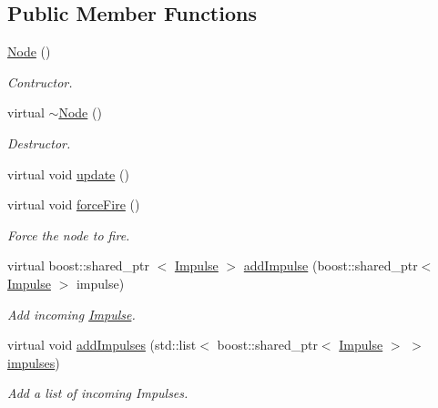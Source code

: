 \subsection*{\-Public \-Member \-Functions}
\begin{DoxyCompactItemize}
\item 
\hyperlink{classcryomesh_1_1components_1_1Node_aa28b184629aa9412666b9674a10c45ab}{\-Node} ()
\begin{DoxyCompactList}\small\item\em \-Contructor. \end{DoxyCompactList}\item 
virtual \hyperlink{classcryomesh_1_1components_1_1Node_ae1ac5a2ed22ebc9b0cb7055b3e456097}{$\sim$\-Node} ()
\begin{DoxyCompactList}\small\item\em \-Destructor. \end{DoxyCompactList}\item 
virtual void \hyperlink{classcryomesh_1_1components_1_1Node_a960b083db047bb1b860d4ed09f9ad583}{update} ()
\item 
virtual void \hyperlink{classcryomesh_1_1components_1_1Node_ac40f33e5d0986d208b21302232f8a165}{force\-Fire} ()
\begin{DoxyCompactList}\small\item\em \-Force the node to fire. \end{DoxyCompactList}\item 
virtual boost\-::shared\-\_\-ptr\*
$<$ \hyperlink{classcryomesh_1_1components_1_1Impulse}{\-Impulse} $>$ \hyperlink{classcryomesh_1_1components_1_1Node_a1098a370eba39dce1388d657e3d3aef9}{add\-Impulse} (boost\-::shared\-\_\-ptr$<$ \hyperlink{classcryomesh_1_1components_1_1Impulse}{\-Impulse} $>$ impulse)
\begin{DoxyCompactList}\small\item\em \-Add incoming \hyperlink{classcryomesh_1_1components_1_1Impulse}{\-Impulse}. \end{DoxyCompactList}\item 
virtual void \hyperlink{classcryomesh_1_1components_1_1Node_af8ab49ec82ff876549f75123d65c41b4}{add\-Impulses} (std\-::list$<$ boost\-::shared\-\_\-ptr$<$ \hyperlink{classcryomesh_1_1components_1_1Impulse}{\-Impulse} $>$ $>$ \hyperlink{classcryomesh_1_1components_1_1Node_a8e9ae8373052bb63f2f1e6e453a3c18d}{impulses})
\begin{DoxyCompactList}\small\item\em \-Add a list of incoming \-Impulses. \end{DoxyCompactList}\item 

\end{DoxyCompactItemize}
